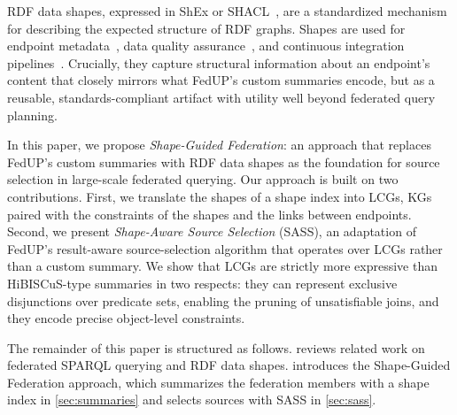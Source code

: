 RDF data shapes, expressed in ShEx or SHACL~\cite{Gayo2018c}, are a standardized mechanism
for describing the expected structure of RDF graphs.
Shapes are used for endpoint metadata~\cite{makelburg2025shacl},
data quality assurance~\cite{cortes2025shacl}, and continuous integration pipelines~\cite{publio2022ontolo,publio2018shark}.
Crucially, they capture structural information about an endpoint's content that closely mirrors what FedUP's custom summaries encode,
but as a reusable, standards-compliant artifact with utility well beyond federated query planning.

In this paper, we propose \emph{Shape-Guided Federation}: an approach that replaces FedUP's custom summaries
with RDF data shapes as the foundation for source selection in large-scale federated querying.
Our approach is built on two contributions.
First, we translate the shapes of a shape index into \acp{LCG},
\acp{KG} paired with the constraints of the shapes and the links between endpoints.
Second, we present \emph{Shape-Aware Source Selection} (SASS),
an adaptation of FedUP's result-aware source-selection algorithm that operates over \acp{LCG} rather than a custom summary.
We show that \acp{LCG} are strictly more expressive than HiBISCuS-type summaries in two respects:
they can represent exclusive disjunctions over predicate sets,
enabling the pruning of unsatisfiable joins,
and they encode precise object-level constraints.

The remainder of this paper is structured as follows.
 reviews related work on federated SPARQL querying and RDF data shapes.
 introduces the Shape-Guided Federation approach, which summarizes the federation members with a shape index in \cref{sec:summaries} and selects sources with \ac{SASS} in \cref{sec:sass}.
